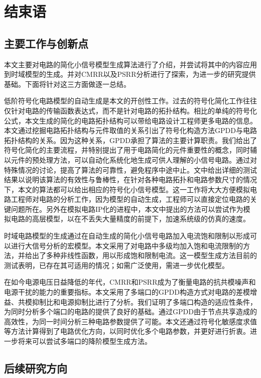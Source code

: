 \chapter{结束语}
\label{chap:con}

\section{主要工作与创新点}
\label{sec:con:job}

本文主要对电路的简化小信号模型生成算法进行了介绍，并尝试将其中的内容应用到时域模型的生成。并对CMRR以及PSRR分析进行了探索，为进一步的研究提供基础。下面将针对这三方面做逐一总结。

低阶符号化电路模型的自动生成是本文的开创性工作。过去的符号化简化工作往往仅针对电路的传输函数表达式，而不是针对电路的拓扑结构。相比的单纯的符号化公式，本文生成的简化的电路拓扑结构可以带给电路设计工程师更多电路的信息。本文通过挖掘电路拓扑结构与元件取值的关系引出了符号化构造方法GPDD与电路拓扑结构的关系。因为这种关系，GPDD承担了算法的主要计算职责。我们给出了符号化简化的主要流程，并特别提出了用于电路简化的元件重要性的概念，同时辅以元件的预处理方法，可以自动化系统化地生成可供人理解的小信号电路。通过对特殊情况的讨论，提高了算法的可靠性，避免程序中途中止。文中给出详细的测试结果以说明该算法的有效性与鲁棒性，在针对各种电路拓扑和电路参数尺寸的情况下，本文的算法都可以给出相应的符号化小信号模型。这一工作将大大方便模拟电路工程师对电路的分析工作，因为模型的自动生成，工程师可以直接定位电路的关键问题所在。另外在模拟电路IP化的进程中，本文中提出的方法可以尝试作为模拟电路的高层模型，以在不丢失大量精度的前提下，加速系统级的仿真的速度。

时域电路模型的生成通过在自动生成的简化小信号电路加入电流饱和限制以形成可以进行大信号分析的宏模型。本文采用了对电路中多级均加入饱和电流限制的方法，并给出了多种非线性函数，用以形成饱和限制电流。这一模型生成方法目前的测试表明，已存在其可适用的情况；如需广泛使用，需进一步优化模型。

在如今电源电压日益降低的年代，CMRR和PSRR成为了衡量电路的抗共模噪声和电源干扰的能力的重要指标。本文采用了多端口的GPDD构造方式对电路的差模增益、共模抑制比和电源抑制比进行了分析。我们证明了多端口构造的适应性条件，为同时分析多个端口的电路的提供了良好的基础。通过GPDD由于节点共享造成的高效性，为同一时间分析三种电路参数提供了可能。本文还通过符号化敏感度求值等方法计算得到了电路优化方向，以同时优化多个电路参数，并更好进行折衷。进一步将来可以尝试多端口的降阶模型生成方法。

\section{后续研究方向}
\label{sec:con:future}

